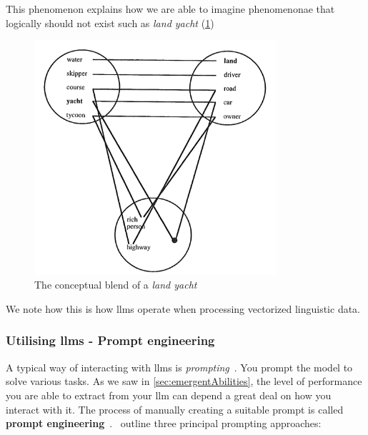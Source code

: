 This phenomenon explains how we are able to imagine phenomenonae that logically
should not exist such as \textit{land yacht} (\cref{fig:landYacht})

\begin{figure}[h]
    \centering
    \includegraphics[width=0.8\textwidth]{media/landYacht.png}
    \caption[Land yacht conceptual blend]{The conceptual blend of a \textit{land
            yacht}\footnotemark}\label{fig:landYacht}
\end{figure}


We note how this is how \acrshort{llms} operate when processing vectorized
linguistic data.


\subsubsection{Utilising \acrshort{llms} - Prompt engineering}\label{sec:llmUtilization}


A typical way of interacting with \acrshort{llms} is \textit{prompting}~\cite[44]{llmSurvey}. You
prompt the model to solve various tasks. As we saw in \cref{sec:emergentAbilities}, the level of
performance you are able to extract from your \acrlong{llm} can depend a great deal on how you
interact with it. The process of manually creating a suitable prompt is called \textbf{prompt
    engineering}~\cite[44]{llmSurvey}.~\citeauthor{llmSurvey} outline three principal prompting
approaches:


